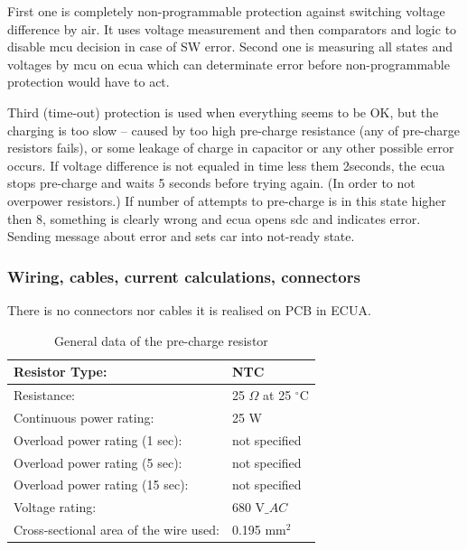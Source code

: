 First one is completely non-programmable protection against switching voltage difference by \gls{air}. It uses voltage measurement and then comparators and logic to disable \gls{mcu} decision in case of SW error.
Second one is measuring all states and voltages by \gls{mcu} on \gls{ecua} which can determinate error before non-programmable protection would have to act.

Third (time-out) protection is used when everything seems to be OK, but the charging is too slow – caused by too high pre-charge resistance (any of pre-charge resistors fails), or some leakage of charge in capacitor or any other possible error occurs. If voltage difference is not equaled in time less them 2seconds, the \gls{ecua} stops pre-charge and waits 5 seconds before trying again. (In order to not overpower resistors.) If number of attempts to pre-charge is in this state higher then 8, something is clearly wrong and \gls{ecua} opens \gls{sdc} and indicates error. Sending message about error and sets car into not-ready state.

\subsubsection{Wiring, cables, current calculations, connectors}

There is no connectors nor cables it is realised on PCB in ECUA. 


\begin{table}[H]
	\centering
	\caption{General data of the pre-charge resistor}
	\begin{tabularx}{\textwidth}{|X|X|}
		\hline
		Resistor Type: & NTC \\[\TableSize]
		\hline

		Resistance: & 25 $\Omega$ at 25 $^\circ$C\\[\TableSize]
		\hline
		Continuous power rating: & 25 W \\[\TableSize]
		\hline
		Overload power rating (1 sec): & not specified \\[\TableSize]
		\hline
		Overload power rating (5 sec): & not specified \\[\TableSize]
		\hline
		Overload power rating (15 sec): & not specified \\[\TableSize]
		\hline
		Voltage rating: & 680 V$\_AC$\\[\TableSize]
		\hline
		Cross-sectional area of the wire used: & 0.195 mm$^2$\\[\TableSize]
		\hline
	\end{tabularx}%
	\label{tab:precharge-general}%
\end{table}%

